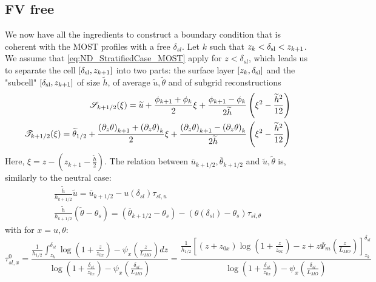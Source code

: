 \subsection{FV free}

We now have all the ingredients to construct a boundary condition
that is coherent with the MOST profiles with a free
$\delta_{sl}$. Let $k$ such that $z_k < \delta_{\rm sl} < z_{k+1}$.
We assume that
\eqref{eq:ND_StratifiedCase_MOST} apply for $z<\delta_{sl}$,
which leads us to separate the 
cell $[\delta_{\rm sl}, z_{k+1}]$
into two parts: the surface layer $[z_k,\delta_{\rm sl}]$ and the
"subcell" $[\delta_{\rm sl}, z_{k+1}]$ of size $\widetilde{h}$, of
average $\widetilde{u}, \widetilde{\theta}$
and of subgrid reconstructions
\begin{equation}
\begin{aligned}
{\cal S}_{k+1/2}(\xi) = \widetilde{u} +
	\frac{\phi_{k+1} + \phi_{k}}{2} \xi
+ \frac{\phi_{k+1} - \phi_{k}}{2\widetilde{h}}
	\left(\xi^2 - \frac{\widetilde{h}^2}{12}\right) \\
{\cal T}_{k+1/2}(\xi) = \widetilde{\theta}_{1/2} +
	\frac{{(\partial_z \theta)}_{k+1} + 
		{(\partial_z \theta)}_{k}}{2} \xi
+ \frac{{(\partial_z \theta)}_{k+1} - {(\partial_z \theta)}_{k}}
	{2\widetilde{h}}
	\left(\xi^2 - \frac{\widetilde{h}^2}{12}\right)
\end{aligned}
\end{equation}
Here, $\xi = z - (z_{k+1} - \frac{\widetilde{h}}{2})$.
The relation between
$\overline{u}_{k+1/2}, \overline{\theta}_{k+1/2}$ and
$\widetilde{u},\widetilde{\theta}$ is, similarly to the neutral case:
\begin{equation} \label{eq:ND_StratifiedCase_tmprelation_tilde_bar}
\begin{aligned}
\frac{\widetilde{h}}{h_{k+1/2}} \widetilde{u} =
	\overline{u}_{k+1/2} - u(\delta_{sl}) \tau_{sl, u}\\
\frac{\widetilde{h}}{h_{k+1/2}} (\widetilde{\theta} - \theta_s) =
	(\overline{\theta}_{k+1/2}-\theta_s) -
	(\theta(\delta_{sl})-\theta_s)\tau_{sl, \theta}
\end{aligned}
\end{equation}
with for $x = u, \theta$:
\begin{equation}
\tau_{sl, x}^0 = \frac{\frac{1}{{h_{1/2}}}\int_{z_k}^{\delta_{sl}} \log(1+\frac{z}{z_{0x}})- \psi_x(\frac{z}{L_{MO}})
	dz}{\log(1+\frac{\delta_{sl}}{z_{0x}})- \psi_x(\frac{\delta_{sl}}{L_{MO}})
    }
    =
 \frac{\frac{1}{{h_{1/2}}}
    \left[
	    (z+z_{0x})\log(1+\frac{z}{z_{0x}})-z
    +
    z \Psi_m(\frac{z}{L_{MO}}) \right]_{z_k}^{\delta_{sl}}
    }{\log(1+\frac{\delta_{sl}}{z_{0x}})- \psi_x(\frac{\delta_{sl}}{L_{MO}})
    }
\end{equation}
